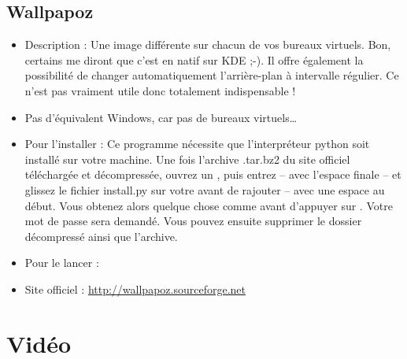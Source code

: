 \subsection{Wallpapoz}
\begin{itemize}
\begingroup
{}
\item Description : Une image différente sur chacun de vos bureaux virtuels. Bon, certains me diront que c'est en natif sur KDE ;-). Il offre également la possibilité de changer automatiquement l'arrière-plan à intervalle régulier. Ce n'est pas vraiment utile donc totalement indispensable !{\par}
\endgroup
\item Pas d'équivalent Windows, car pas de bureaux virtuels\ldots{}{\par}
\item Pour l'installer : Ce programme nécessite que l'interpréteur python soit installé sur votre machine. Une fois l'archive .tar.bz2 du site officiel téléchargée et décompressée, ouvrez un , puis entrez  -- avec l'espace finale -- et glissez le fichier install.py sur votre  avant de rajouter  -- avec une espace au début. Vous obtenez alors quelque chose comme  avant d'appuyer sur . Votre mot de passe sera demandé. Vous pouvez ensuite supprimer le dossier décompressé ainsi que l'archive.{\par}
\item Pour le lancer : 
\item Site officiel : \url{http://wallpapoz.sourceforge.net}{\par}
\end{itemize}

\section{Vidéo}
